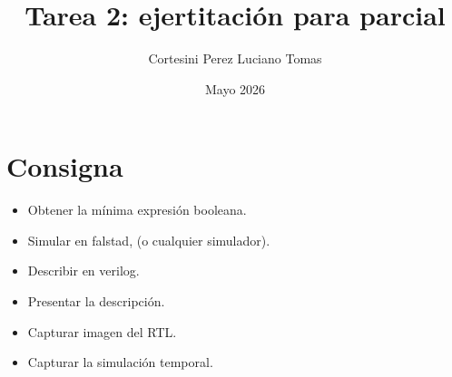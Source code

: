 \documentclass{article}
\title{Tarea 2: ejertitación para parcial}
\author{Cortesini Perez Luciano Tomas}
\date{Mayo 2026}
\begin{document}
\maketitle

\section{Consigna}

\begin{itemize}
    \item Obtener la mínima expresión booleana.
    \item Simular en falstad, (o cualquier simulador).
    \item Describir en verilog.
    \item Presentar la descripción.
    \item Capturar imagen del RTL.
    \item Capturar la simulación temporal.
\end{itemize}









\end{document}
